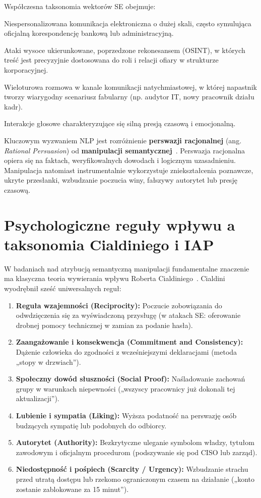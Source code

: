 \documentclass[12pt,a4paper,twoside]{report}
\begin{document}
Współczesna taksonomia wektorów SE obejmuje:
\begin{description}[leftmargin=1.5em]
  \item[Phishing masowy:] Niespersonalizowana komunikacja elektroniczna o dużej skali, często symulująca oficjalną korespondencję bankową lub administracyjną.
  \item[Spear-phishing i BEC:] Ataki wysoce ukierunkowane, poprzedzone rekonesansem (OSINT), w których treść jest precyzyjnie dostosowana do roli i relacji ofiary w strukturze korporacyjnej.
  \item[Pretexting czatowy:] Wieloturowa rozmowa w kanale komunikacji natychmiastowej, w której napastnik tworzy wiarygodny scenariusz fabularny (np. audytor IT, nowy pracownik działu kadr).
  \item[Vishing / Scam telefoniczny:] Interakcje głosowe charakteryzujące się silną presją czasową i emocjonalną.
\end{description}

Kluczowym wyzwaniem NLP jest rozróżnienie \textbf{perswazji racjonalnej} (ang. \emph{Rational Persuasion}) od \textbf{manipulacji semantycznej}~\cite{safepersuasion2025,mentalmanip2024}. Perswazja racjonalna opiera się na faktach, weryfikowalnych dowodach i logicznym uzasadnieniu. Manipulacja natomiast instrumentalnie wykorzystuje zniekształcenia poznawcze, ukryte przesłanki, wzbudzanie poczucia winy, fałszywy autorytet lub presję czasową.

\section{Psychologiczne reguły wpływu a taksonomia Cialdiniego i IAP}
W badaniach nad atrybucją semantyczną manipulacji fundamentalne znaczenie ma klasyczna teoria wywierania wpływu Roberta Cialdiniego~\cite{cialdini2006}. Cialdini wyodrębnił sześć uniwersalnych reguł:
\begin{enumerate}[leftmargin=*]
  \item \textbf{Reguła wzajemności (Reciprocity):} Poczucie zobowiązania do odwdzięczenia się za wyświadczoną przysługę (w atakach SE: oferowanie drobnej pomocy technicznej w zamian za podanie hasła).
  \item \textbf{Zaangażowanie i konsekwencja (Commitment and Consistency):} Dążenie człowieka do zgodności z wcześniejszymi deklaracjami (metoda „stopy w drzwiach”).
  \item \textbf{Społeczny dowód słuszności (Social Proof):} Naśladowanie zachowań grupy w warunkach niepewności („wszyscy pracownicy już dokonali tej aktualizacji”).
  \item \textbf{Lubienie i sympatia (Liking):} Wyższa podatność na perswazję osób budzących sympatię lub podobnych do odbiorcy.
  \item \textbf{Autorytet (Authority):} Bezkrytyczne uleganie symbolom władzy, tytułom zawodowym i oficjalnym procedurom (podszywanie się pod CISO lub zarząd).
  \item \textbf{Niedostępność i pośpiech (Scarcity / Urgency):} Wzbudzanie strachu przed utratą dostępu lub rzekomo ograniczonym czasem na działanie („konto zostanie zablokowane za 15 minut”).
\end{enumerate}
\end{document}
